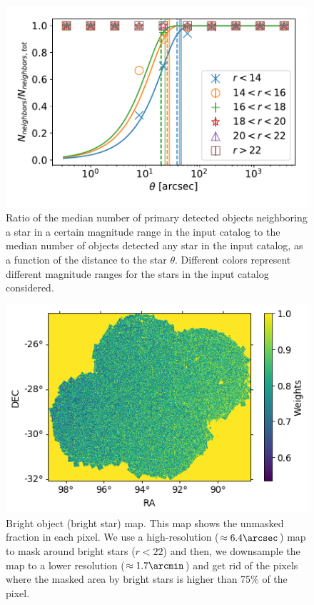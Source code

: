 \documentclass[\docopts]{\docclass}
\begin{document}
\begin{figure}
\centering
\includegraphics[width=0.9\columnwidth]{bright_object_masking}
\caption{Ratio of the median number of primary detected objects neighboring a star in a certain magnitude range in the input catalog to the median number of objects detected any star in the input catalog, as a function of the distance to the star $\theta$. Different colors represent different magnitude ranges for the stars in the input catalog considered.}
\label{fig:bright_object_masking}
\end{figure}
\begin{figure}
\centering
\includegraphics[width=0.9\columnwidth]{bo_mask}
\caption{Bright object (bright star) map. This map shows the unmasked fraction in each pixel. We use a high-resolution ($\approx 6.4 \arcsec$) map to mask around bright stars ($r < 22$) and then, we downsample the map to a lower resolution ($\approx 1.7 \arcmin$) and get rid of the pixels where the masked area by bright stars is higher than 75\% of the pixel.}
\label{fig:bo_mask}
\end{figure} 
\end{document}
